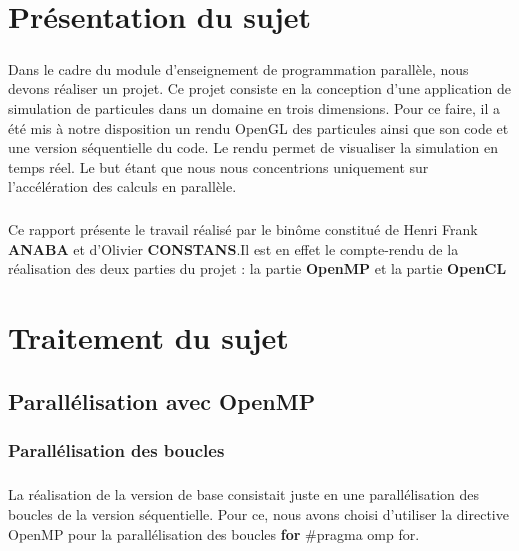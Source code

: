 \documentclass[a4paper,11pt]{report}
\begin{document}

\newpage

\begingroup
\tableofcontents
\endgroup



\chapter{Présentation du sujet}

\paragraph{}
Dans le cadre du module d'enseignement de programmation parallèle, nous devons réaliser un projet. Ce projet consiste en la conception d'une application de simulation de particules dans un domaine en trois dimensions. Pour ce faire, il a été mis à notre disposition un rendu OpenGL des particules ainsi que son code et une version séquentielle du code. Le rendu permet de visualiser la simulation en temps réel. Le but étant que nous nous concentrions uniquement sur l'accélération des calculs en parallèle.
\paragraph{}
Ce rapport présente le travail réalisé par le binôme constitué de Henri Frank \textbf{ANABA} et d'Olivier \textbf{CONSTANS}.Il est en effet le compte-rendu de la réalisation  des deux parties  du projet : la partie \textbf{OpenMP} et la partie  \textbf{OpenCL}


\chapter{Traitement du sujet}
\section{Parallélisation avec \textbf{OpenMP}}

\subsection{Parallélisation des boucles}

\paragraph{}
La réalisation de la version de base consistait juste en une parallélisation des boucles de la version séquentielle. Pour ce, nous avons choisi d'utiliser la directive OpenMP pour la parallélisation des boucles \textbf{for} \#pragma omp for. 
\end{document}
